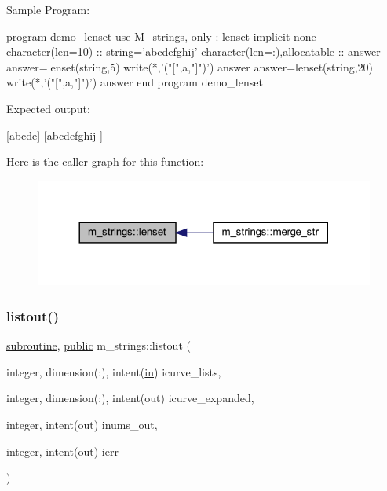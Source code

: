 \begin{DoxyVerb}Sample Program:

 program demo_lenset
  use M_strings, only : lenset
  implicit none
  character(len=10)            :: string='abcdefghij'
  character(len=:),allocatable :: answer
     answer=lenset(string,5)
     write(*,'("[",a,"]")') answer
     answer=lenset(string,20)
     write(*,'("[",a,"]")') answer
 end program demo_lenset

Expected output:

 [abcde]
 [abcdefghij          ] \end{DoxyVerb}
 Here is the caller graph for this function\+:
\nopagebreak
\begin{figure}[H]
\begin{center}
\leavevmode
\includegraphics[width=317pt]{namespacem__strings_a378563bb49f128bf0cf9c9d2b1f34498_icgraph}
\end{center}
\end{figure}
\mbox{\label{namespacem__strings_a81b4b7f4f301b9e17604adbcace58d0c}} 
\subsubsection{\texorpdfstring{listout()}{listout()}}
{\footnotesize\ttfamily \hyperlink{M__stopwatch_83_8txt_acfbcff50169d691ff02d4a123ed70482}{subroutine}, \hyperlink{M__stopwatch_83_8txt_a2f74811300c361e53b430611a7d1769f}{public} m\+\_\+strings\+::listout (\begin{DoxyParamCaption}\item[{integer, dimension(\+:), intent(\hyperlink{M__journal_83_8txt_afce72651d1eed785a2132bee863b2f38}{in})}]{icurve\+\_\+lists,  }\item[{integer, dimension(\+:), intent(out)}]{icurve\+\_\+expanded,  }\item[{integer, intent(out)}]{inums\+\_\+out,  }\item[{integer, intent(out)}]{ierr }\end{DoxyParamCaption})}



